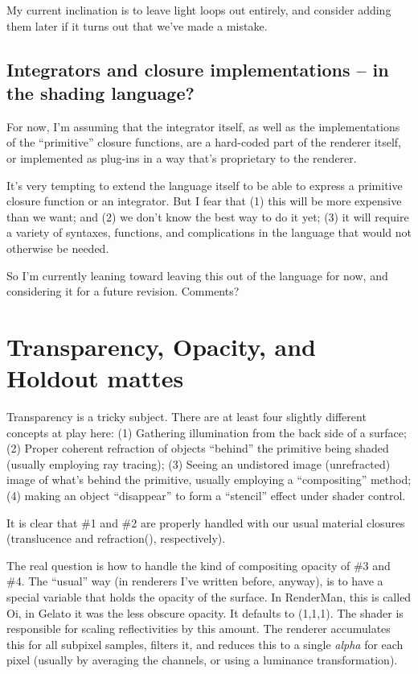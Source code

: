 \documentclass[11pt,letterpaper]{book}
\begin{document}
\begin{annotate}
My current inclination is to leave light loops out entirely, and
consider adding them later if it turns out that we've made a mistake.

\subsection{Integrators and closure implementations -- in the shading language?}

For now, I'm assuming that the integrator itself, as well as the
implementations of the ``primitive'' closure functions, are a hard-coded
part of the renderer itself, or implemented as plug-ins in a way that's
proprietary to the renderer.

It's very tempting to extend the language itself to be able to express a
primitive closure function or an integrator.  But I fear that (1) this
will be more expensive than we want; and (2) we don't know the best way
to do it yet; (3) it will require a variety of syntaxes, functions, and
complications in the language that would not otherwise be needed.  

So I'm currently leaning toward leaving this out of the language for
now, and considering it for a future revision.  Comments?

\section{Transparency, Opacity, and Holdout mattes}

Transparency is a tricky subject.  There are at least four slightly
different concepts at play here: (1) Gathering illumination from the
back side of a surface; (2) Proper coherent refraction of objects
``behind'' the primitive being shaded (usually employing ray tracing);
(3) Seeing an undistored image (unrefracted) image of what's behind the
primitive, usually employing a ``compositing'' method; (4) making an
object ``disappear'' to form a ``stencil'' effect under shader control.

It is clear that \#1 and \#2 are properly handled with our usual 
material closures ({\cf translucence} and {\cf refraction()},
respectively).

The real question is how to handle the kind of compositing opacity of
\#3 and \#4.  The ``usual'' way (in renderers I've written before,
anyway), is to have a special variable that holds the opacity of the
surface.  In RenderMan, this is called {\cf Oi}, in Gelato it was the
less obscure {\cf opacity}.  It defaults to (1,1,1).  The shader is
responsible for scaling reflectivities by this amount.  The renderer
accumulates this for all subpixel samples, filters it, and reduces this
to a single \emph{alpha} for each pixel (usually by averaging the
channels, or using a luminance transformation).


\end{annotate}
\end{document}
